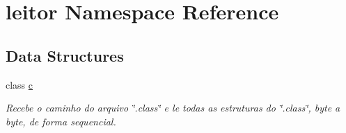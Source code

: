 \hypertarget{namespaceleitor}{}\section{leitor Namespace Reference}
\label{namespaceleitor}
\subsection*{Data Structures}
\begin{DoxyCompactItemize}
\item 
class \hyperlink{classleitor_1_1c}{c}
\begin{DoxyCompactList}\small\item\em Recebe o caminho do arquivo \char`\"{}.\+class\char`\"{} e le todas as estruturas do \char`\"{}.\+class\char`\"{}, byte a byte, de forma sequencial. \end{DoxyCompactList}\end{DoxyCompactItemize}
